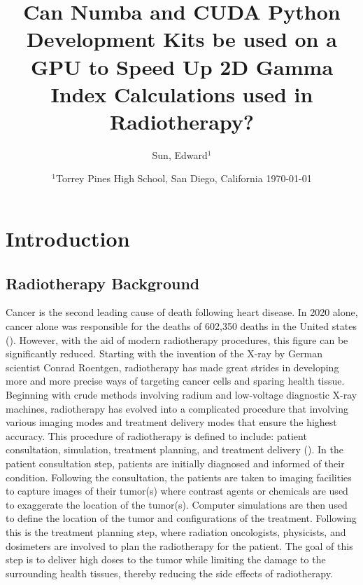 \documentclass[12pt]{article}
\title{Can Numba and CUDA Python Development Kits be used on a GPU to Speed Up 2D Gamma Index Calculations used in Radiotherapy?}
\author{
  Sun, Edward$^{1}$
}
\date{%
  $^{1}$Torrey Pines High School, San Diego, California
  \today
}
\begin{document}
\maketitle
\section{Introduction}
\subsection{Radiotherapy Background}
Cancer is the second leading cause of death following heart disease. In 2020 alone, cancer alone was responsible for the deaths of 602,350 deaths in the United states (\textcite{CDC}). However, with the aid of modern radiotherapy procedures, this figure can be significantly reduced. Starting with the invention of the X-ray by German scientist Conrad Roentgen, radiotherapy has made great strides in developing more and more precise ways of targeting cancer cells and sparing health tissue. Beginning with crude methods involving radium and low-voltage diagnostic X-ray machines, radiotherapy has evolved into a complicated procedure that involving various imaging modes and treatment delivery modes that ensure the highest accuracy. This procedure of radiotherapy is defined to include: patient consultation, simulation, treatment planning, and treatment delivery (\textcite{SBU}). In the patient consultation step, patients are initially diagnosed and informed of their condition. Following the consultation, the patients are taken to imaging facilities to capture images of their tumor(s) where contrast agents or chemicals are used to exaggerate the location of the tumor(s).  Computer simulations are then used to define the location of the tumor  and configurations of the treatment. Following this is the treatment planning step, where radiation oncologists, physicists, and dosimeters are involved to plan the radiotherapy for the patient. The goal of this step is to deliver high doses to the tumor while limiting the damage to the surrounding health tissues, thereby reducing the side effects of radiotherapy.
\end{document}
